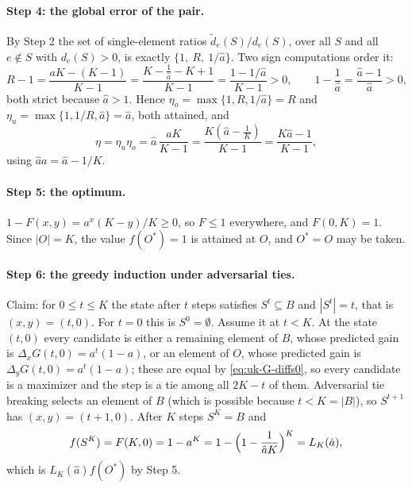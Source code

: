 \paragraph{Step 4: the global error of the pair.}
By Step 2 the set of single-element ratios $\tilde d_e(S)/d_e(S)$, over all
$S$ and all $e\notin S$ with $d_e(S)>0$, is exactly $\{1,\ R,\ 1/\hat a\}$.
Two sign computations order it:
\[
  R-1=\frac{aK-(K-1)}{K-1}=\frac{K-\tfrac1{\hat a}-K+1}{K-1}
     =\frac{1-1/\hat a}{K-1}>0,\qquad
  1-\frac1{\hat a}=\frac{\hat a-1}{\hat a}>0 ,
\]
both strict because $\hat a>1$.  Hence
$\eta_o=\max\{1,R,1/\hat a\}=R$ and $\eta_u=\max\{1,1/R,\hat a\}=\hat a$, both
attained, and
\begin{equation}\label{eq:uk-eta}
  \eta=\eta_u\eta_o=\hat a\,\frac{aK}{K-1}
   =\frac{K(\hat a-\tfrac1K)}{K-1}=\frac{K\hat a-1}{K-1},
\end{equation}
using $\hat aa=\hat a-1/K$.

\paragraph{Step 5: the optimum.}
$1-F(x,y)=a^{x}(K-y)/K\ge0$, so $F\le1$ everywhere, and $F(0,K)=1$.  Since
$|O|=K$, the value $f(O^{\ast})=1$ is attained at $O$, and $O^{\ast}=O$ may be
taken.

\paragraph{Step 6: the greedy induction under adversarial ties.}
Claim: for $0\le t\le K$ the state after $t$ steps satisfies $S^{t}\subseteq B$
and $|S^{t}|=t$, that is $(x,y)=(t,0)$.  For $t=0$ this is $S^{0}=\emptyset$.
Assume it at $t<K$.  At the state $(t,0)$ every candidate is either a
remaining element of $B$, whose predicted gain is $\Delta_xG(t,0)=a^{t}(1-a)$,
or an element of $O$, whose predicted gain is $\Delta_yG(t,0)=a^{t}(1-a)$;
these are equal by \eqref{eq:uk-G-diffs0}, so every candidate is a maximizer
and the step is a tie among all $2K-t$ of them.  Adversarial tie breaking
selects an element of $B$ (which is possible because $t<K=|B|$), so
$S^{t+1}$ has $(x,y)=(t+1,0)$.  After $K$ steps $S^{K}=B$ and
\[
  f(S^{K})=F(K,0)=1-a^{K}
  =1-\Bigl(1-\frac{1}{\hat aK}\Bigr)^{K}=L_K(\hat a),
\]
which is $L_K(\hat a)f(O^{\ast})$ by Step 5.

